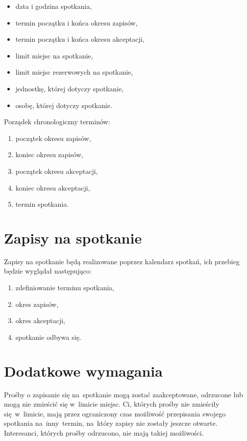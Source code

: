 \documentclass[licencjacka]{pracamgr}
\begin{document}
\begin{itemize}
\setlength\itemsep{0,05em}
    \item data i godzina spotkania,
    \item termin początku i końca okresu zapisów,
    \item termin początku i końca okresu akceptacji,
    \item limit miejsc na spotkanie,
    \item limit miejsc rezerwowych na spotkanie,
    \item jednostkę, której dotyczy spotkanie,
    \item osobę, której dotyczy spotkanie.
\end{itemize}

Porządek chronologiczny terminów:

\begin{enumerate}
\setlength\itemsep{0,05em}
    \item początek okresu zapisów,
    \item koniec okresu zapisów,
    \item początek okresu akceptacji,
    \item koniec okresu akceptacji,
    \item termin spotkania.
\end{enumerate}

\section{Zapisy na spotkanie}
Zapisy na spotkanie będą realizowane poprzez kalendarz spotkań, ich przebieg będzie wyglądał następująco:

\begin{enumerate}
    \item zdefiniowanie terminu spotkania,
    \item okres zapisów,
    \item okres akceptacji,
    \item spotkanie odbywa się.
\end{enumerate}

\section{Dodatkowe wymagania}
Prośby o zapisanie się na~spotkanie mogą zostać zaakceptowane, odrzucone lub mogą nie zmieścić się w~limicie miejsc. Ci, których prośby nie zmieściły się~w~limicie, mają przez ograniczony czas możliwość przepisania swojego spotkania na~inny~termin, na~który zapisy nie zostały jeszcze otwarte. Interesanci, których prośby odrzucono, nie mają takiej możliwości.
\end{document}
